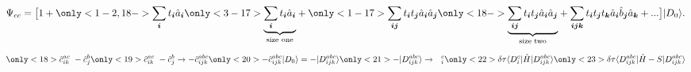 \documentclass{beamer}
\begin{document}
\begin{frame}
\begin{center}
\begin{tikzpicture}[scale=.7,every node/.style={minimum size=1cm},on grid]
			
			
			\end{tikzpicture}
		\end{center}	
\begin{equation*}
\Psi_{cc} = \big[1 +\only<1-2,18->{\sum_{\boldsymbol{i}} t_{\boldsymbol{i}}\hat{a}_{\boldsymbol{i}}\vphantom{\underbrace{\sum_{\boldsymbol{i}} t_{\boldsymbol{i}}\hat{a}_{\boldsymbol{i}}}_\text{size one}}}\only<3-17>{\underbrace{\sum_{\boldsymbol{i}} t_{\boldsymbol{i}}\hat{a}_{\boldsymbol{i}}}_\text{size one}}+
\only<1-17>{\sum_{\boldsymbol{ij}} t_{\boldsymbol{i}} t_{\boldsymbol{j}} \hat{a}_{\boldsymbol{i}} \hat{a}_{\boldsymbol{j}}}\vphantom{\underbrace{\sum_{\boldsymbol{ij}} t_{\boldsymbol{i}} t_{\boldsymbol{j}} \hat{a}_{\boldsymbol{i}} \hat{a}_{\boldsymbol{j}}}_\text{size two}}
\only<18->{\underbrace{\sum_{\boldsymbol{ij}} t_{\boldsymbol{i}} t_{\boldsymbol{j}} \hat{a}_{\boldsymbol{i}} \hat{a}_{\boldsymbol{j}}}_\text{size two}}
+ \sum_{\boldsymbol{ijk}}t_{\boldsymbol{i}} t_{\boldsymbol{j}} t_{\boldsymbol{k}} \hat{a}_{\boldsymbol{i}} \hat{b}_{\boldsymbol{j}} \hat{a}_{\boldsymbol{k}} + ...  \big]|D_0\rangle.
\end{equation*}
\begin{equation*}
\only<18>{\hat{c}_{ik}^{ac} \ -\hat{c}_j^b}
\only<19>{\hat{c}_{ik}^{ac} \ -\hat{c}_j^b \rightarrow -\hat{c}_{ijk}^{abc}}
\only<20>{-\hat{c}_{ijk}^{abc}|D_0\rangle = -|D_{ijk}^{abc}\rangle}
\only<21>{-|D_{ijk}^{abc}\rangle \rightarrow \ \ ^c_i}
\only<22>{\delta\tau \langle D_i^c |\hat{H}|D_{ijk}^{abc}\rangle }
\only<23>{\delta\tau \langle D_{ijk}^{abc} |\hat{H}-S|D_{ijk}^{abc}\rangle }
\end{equation*}
\end{frame}
\end{document}
